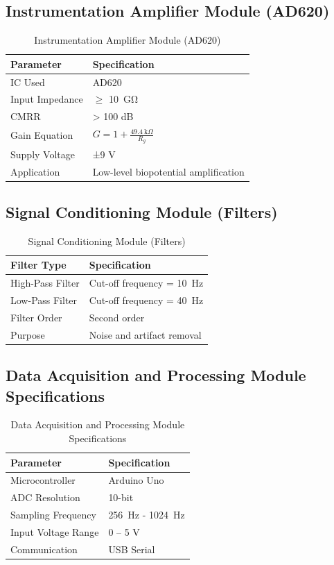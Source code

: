 \subsection{Instrumentation Amplifier Module (AD620)}
\begin{table}[H]
	\centering
	\small
	\caption{Instrumentation Amplifier Module (AD620)}
	\begin{tabular}{p{6.5cm}p{6.5cm}}
		\toprule
		\textbf{Parameter} & \textbf{Specification} \\
		\midrule
		IC Used & AD620 \\
		Input Impedance & $\geq$ \SI{10}{\giga\ohm} \\
		CMRR & > 100 dB \\
		Gain Equation & \( G = 1 + \frac{49.4~\text{k}\Omega}{R_g} \) \\
		Supply Voltage & ±9 V \\
		Application & Low-level biopotential amplification \\
		\bottomrule
	\end{tabular}
\end{table}

\subsection{Signal Conditioning Module (Filters)}
\begin{table}[H]
	\centering
	\small
	\caption{Signal Conditioning Module (Filters)}
	\begin{tabular}{p{6.5cm}p{6.5cm}}
		\toprule
		\textbf{Filter Type} & \textbf{Specification} \\
		\midrule
		High-Pass Filter & Cut-off frequency = \SI{10}{\hertz} \\
		Low-Pass Filter & Cut-off frequency = \SI{40}{\hertz} \\
		Filter Order & Second order \\
		Purpose & Noise and artifact removal \\
		\bottomrule
	\end{tabular}
\end{table}

\subsection{Data Acquisition and Processing Module Specifications}
\begin{table}[H]
	\centering
	\small
	\caption{Data Acquisition and Processing Module Specifications}
	\begin{tabular}{p{6.5cm}p{6.5cm}}
		\toprule
		\textbf{Parameter} & \textbf{Specification} \\
		\midrule
		Microcontroller & Arduino Uno \\
		ADC Resolution & 10-bit \\
		Sampling Frequency & \SI{256}{\hertz} - \SI{1024}{\hertz} \\
		Input Voltage Range & 0 – 5 V \\
		Communication & USB Serial \\
		\bottomrule
	\end{tabular}
\end{table}

